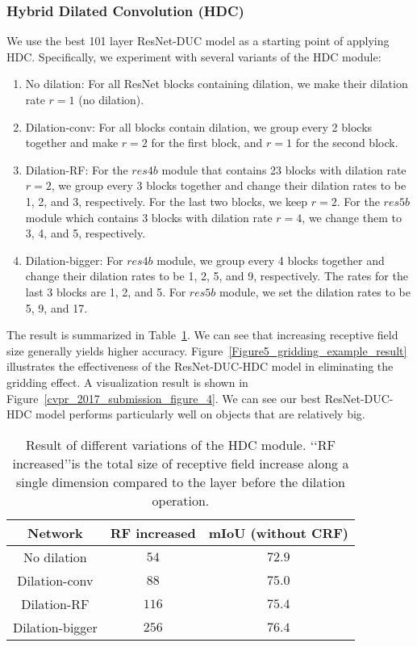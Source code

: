 \documentclass[10pt,twocolumn,letterpaper]{article}
\begin{document}
\subsubsection{Hybrid Dilated Convolution (HDC)}
We use the best 101 layer ResNet-DUC model as a starting point of applying HDC. Specifically, we experiment with several variants of the HDC module:
\begin{enumerate}
  \item No dilation: For all ResNet blocks containing dilation, we make their dilation rate $r=1$ (no dilation).
  \item Dilation-conv: For all blocks contain dilation, we group every 2 blocks together and make $r=2$ for the first block, and $r=1$ for the second block. 
  \item Dilation-RF: For the $res4b$ module that contains 23 blocks with dilation rate $r=2$, we group every 3 blocks together and change their dilation rates to be 1, 2, and 3, respectively. For the last two blocks, we keep $r=2$. For the $res5b$ module which contains 3 blocks with dilation rate $r=4$, we change them to 3, 4, and 5, respectively.
  \item Dilation-bigger: For $res4b$ module, we group every 4 blocks together and change their dilation rates to be 1, 2, 5, and 9, respectively. The rates for the last 3 blocks are 1, 2, and 5. For $res5b$ module, we set the dilation rates to be 5, 9, and 17.
\end{enumerate}
The result is summarized in Table~\ref{table_2}. We can see that increasing receptive field size generally yields higher accuracy. Figure~\ref{Figure5_gridding_example_result} illustrates the effectiveness of the ResNet-DUC-HDC model in eliminating the gridding effect. A visualization result is shown in Figure~\ref{cvpr_2017_submission_figure_4}. We can see our best ResNet-DUC-HDC model performs particularly well on objects that are relatively big. 
\begin{table}[ht]
\begin{center}
\begin{tabular}{cc|c} \toprule[1.75pt]{Network}           &     {RF increased}  &{mIoU (without CRF)}\\ \midrule
   No dilation    &     $54$      & $72.9$\\
   Dilation-conv  &     $88$         & $75.0$ \\ 
   Dilation-RF    &     $116$      & $75.4$ \\
   Dilation-bigger &    $256$         & $76.4$ \\ \bottomrule[1.75pt]
\end{tabular}
\vspace{2pt}
\caption{Result of different variations of the HDC module. \lq\lq RF increased\rq\rq is the total size of receptive field increase along a single dimension compared to the layer before the dilation operation.}
\label{table_2} 
\end{center}
\vspace{-15pt}
\end{table}
\end{document}
